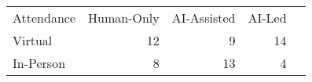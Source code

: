 \begin{tabular}{lrrrr}
\hline\hline
Attendance & Human-Only & AI-Assisted & AI-Led \\
Virtual & 12 &  9 & 14 \\
In-Person &  8 & 13 &  4 \\
\hline\hline
\end{tabular}
